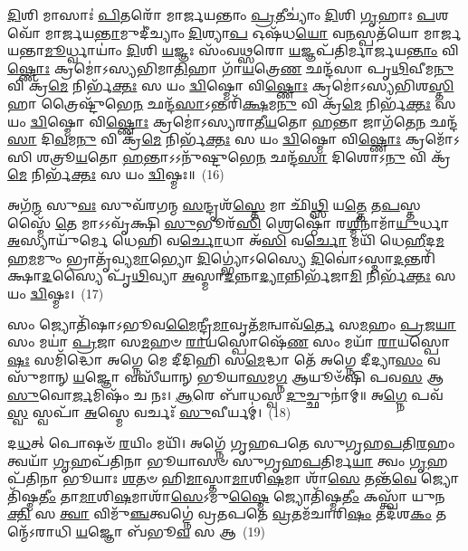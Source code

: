 \-\ul{𑌦𑌿}\-𑌶𑌿 𑌮𑌾𑌸𑌾𑌃॑ \ul{𑌪𑌿}\-𑌤𑌰𑍋᳴ 𑌮𑌾𑌰𑍍𑌜𑌯𑌨𑍍𑌤𑌾𑌂 \ul{𑌪𑍍𑌰}\-𑌤𑍀𑌚𑍍𑌯𑌾𑌂॑ \ul{𑌦𑌿}\-𑌶𑌿 \ul{𑌗𑍃}\-𑌹𑌾𑌃 \ul{𑌪}\-𑌶𑌵𑍋᳴ 𑌮𑌾𑌰𑍍𑌜𑌯\-\ul{𑌨𑍍𑌤𑌾}\-𑌮𑍁𑌦𑍀॑𑌚𑍍𑌯𑌾𑌂 \ul{𑌦𑌿}\-𑌶𑍍𑌯𑌾\-\ul{𑌪} 𑌓𑌷᳴𑌧\-\ul{𑌯𑍋} 𑌵\-\ul{𑌨}\-𑌸𑍍𑌪𑌤᳴𑌯𑍋 𑌮𑌾𑌰𑍍𑌜𑌯𑌨𑍍𑌤𑌾\-\ul{𑌮𑍂}\-𑌰𑍍𑌧𑍍𑌵𑌾𑌯𑌾𑌂॑ \ul{𑌦𑌿}\-𑌶𑌿 \ul{𑌯}\-𑌜𑍍𑌞𑌃 𑌸𑌂᳴𑌵\-\ul{𑌥𑍍𑌸}\-𑌰𑍋 \ul{𑌯}\-𑌜𑍍𑌞𑌪᳴𑌤𑌿𑌰𑍍𑌮𑌾𑌰𑍍𑌜𑌯\-\ul{𑌨𑍍𑌤𑌾𑌂} 𑌵𑌿\-\ul{𑌷𑍍𑌣𑍋𑌃} 𑌕𑍍𑌰𑌮𑍋॑\-𑌽𑌸𑍍𑌯𑌭𑌿𑌮𑌾\-\ul{𑌤𑌿}\-𑌹𑌾 𑌗𑌾᳴\-\ul{𑌯}\-𑌤𑍍𑌰𑍇\-\ul{𑌣} 𑌛𑌨𑍍𑌦᳴𑌸𑌾 𑌪𑍃\-\ul{𑌥𑌿}\-𑌵𑍀𑌮\-\ul{𑌨𑍁} 𑌵𑌿 𑌕𑍍𑌰᳴\-\ul{𑌮𑍇} 𑌨𑌿𑌰𑍍𑌭᳴\-\ul{𑌕𑍍𑌤𑌃} 𑌸 𑌯𑌂 \ul{𑌦𑍍𑌵𑌿}\-𑌷𑍍𑌮𑍋 𑌵𑌿\-\ul{𑌷𑍍𑌣𑍋𑌃} 𑌕𑍍𑌰𑌮𑍋॑\-𑌽𑌸𑍍𑌯𑌭𑌿𑌶\-\ul{𑌸𑍍𑌤𑌿}\-𑌹𑌾 𑌤𑍍𑌰𑍈𑌷𑍍𑌟𑍁᳴𑌭𑍇\-\ul{𑌨} 𑌛𑌨𑍍𑌦᳴\-\ul{𑌸𑌾}\-\-𑌽𑌨𑍍𑌤𑌰𑌿᳴\-\ul{𑌕𑍍𑌷}\-𑌮\-\ul{𑌨𑍁} 𑌵𑌿 𑌕𑍍𑌰᳴\-\ul{𑌮𑍇} 𑌨𑌿𑌰𑍍𑌭᳴\-\ul{𑌕𑍍𑌤𑌃} 𑌸 𑌯𑌂 \ul{𑌦𑍍𑌵𑌿}\-𑌷𑍍𑌮𑍋 𑌵𑌿\-\ul{𑌷𑍍𑌣𑍋𑌃} 𑌕𑍍𑌰𑌮𑍋॑\-𑌽𑌸𑍍𑌯𑌰𑌾𑌤𑍀\-\ul{𑌯}\-𑌤𑍋 \ul{𑌹}\-𑌨𑍍𑌤𑌾 𑌜𑌾𑌗᳴𑌤𑍇\-\ul{𑌨} 𑌛𑌨𑍍𑌦᳴\-\ul{𑌸𑌾} 𑌦𑌿\-\ul{𑌵}\-𑌮\-\ul{𑌨𑍁} 𑌵𑌿 𑌕𑍍𑌰᳴\-\ul{𑌮𑍇} 𑌨𑌿𑌰𑍍𑌭᳴\-\ul{𑌕𑍍𑌤𑌃} 𑌸 𑌯𑌂 \ul{𑌦𑍍𑌵𑌿}\-𑌷𑍍𑌮𑍋 𑌵𑌿\-\ul{𑌷𑍍𑌣𑍋𑌃} 𑌕𑍍𑌰𑌮𑍋᳴\-𑌽𑌸𑌿 𑌶𑌤𑍍𑌰𑍂\-\ul{𑌯}\-𑌤𑍋 \ul{𑌹}\-𑌨𑍍𑌤𑌾\-𑌽\-𑌽𑌨𑍁᳴𑌷𑍍𑌟𑍁𑌭𑍇\-\ul{𑌨} 𑌛𑌨𑍍𑌦᳴\-\ul{𑌸𑌾} 𑌦𑌿𑌶𑍋\-𑌽\-\ul{𑌨𑍁} 𑌵𑌿 𑌕𑍍𑌰᳴\-\ul{𑌮𑍇} 𑌨𑌿𑌰𑍍𑌭᳴\-\ul{𑌕𑍍𑌤𑌃} 𑌸 𑌯𑌂 \ul{𑌦𑍍𑌵𑌿}\-𑌷𑍍𑌮𑌃॥~(16)

{\anuvakamend[{𑌦𑌕𑍍𑌷𑌿᳴𑌣𑌾𑌯𑌾𑌂 \ul{𑌦𑍍𑌵𑌿}\-𑌷𑍍𑌮𑍋 𑌵𑌿\-\ul{𑌷𑍍𑌣𑍋}\-𑌰𑍇\-\ul{𑌕𑌾}\-𑌨𑍍𑌨\-\ul{𑌤𑍍𑌰𑌿}\-\-\ul{𑍞}\-𑌶𑌚𑍍𑌚᳴}]}%

𑌅𑌗᳴\-\ul{𑌨𑍍𑌮} 𑌸𑍁\-\ul{𑌵𑌃} 𑌸𑍁𑌵᳴𑌰𑌗𑌨𑍍𑌮 \ul{𑌸}\-𑌨𑍍𑌦𑍃𑌶᳴\-\ul{𑌸𑍍𑌤𑍇} 𑌮𑌾 𑌛𑌿᳴\-\ul{𑌥𑍍𑌸𑌿} 𑌯\-\ul{𑌤𑍍𑌤𑍇} 𑌤\-\ul{𑌪}\-𑌸𑍍𑌤𑌸𑍍𑌮𑍈᳴ \ul{𑌤𑍇} 𑌮𑌾\-𑌽\-𑌽𑌵𑍃᳴𑌕𑍍𑌷𑌿 \ul{𑌸𑍁}\-𑌭𑍂𑌰᳴\-\ul{𑌸𑌿} 𑌶𑍍𑌰𑍇𑌷𑍍𑌠𑍋᳴ 𑌰\-\ul{𑌶𑍍𑌮𑍀}\-𑌨𑌾𑌮𑌾᳴\-\ul{𑌯𑍁}\-𑌰𑍍𑌧𑌾 \ul{𑌅}\-𑌸𑍍𑌯𑌾𑌯𑍁᳴𑌰𑍍𑌮𑍇 𑌧𑍇𑌹𑌿 𑌵\-\ul{𑌰𑍍𑌚𑍋}\-𑌧𑌾 𑌅᳴\-\ul{𑌸𑌿} 𑌵\-\ul{𑌰𑍍𑌚𑍋} 𑌮𑌯𑌿᳴ 𑌧𑍇\-\ul{𑌹𑍀}\-𑌦\-\ul{𑌮}\-𑌹\-\ul{𑌮}\-𑌮𑍁𑌂 𑌭𑍍𑌰𑌾𑌤𑍃᳴𑌵𑍍𑌯\-\ul{𑌮𑌾}\-𑌭𑍍𑌯𑍋 \ul{𑌦𑌿}\-𑌗𑍍𑌭𑍍𑌯𑍋॑\-𑌽𑌸𑍍𑌯𑍈 \ul{𑌦𑌿}\-𑌵𑍋॑\-𑌽𑌸𑍍𑌮𑌾\-\ul{𑌦}\-𑌨𑍍𑌤𑌰𑌿᳴𑌕𑍍𑌷𑌾\-\ul{𑌦}\-𑌸𑍍𑌯𑍈 𑌪𑍃᳴\-\ul{𑌥𑌿}\-𑌵𑍍𑌯𑌾 \ul{𑌅}\-𑌸𑍍𑌮𑌾\-\ul{𑌦}\-𑌨𑍍𑌨𑌾\-\ul{𑌦𑍍𑌯𑌾}\-𑌨𑍍𑌨𑌿𑌰𑍍𑌭᳴𑌜𑌾\-\ul{𑌮𑌿} 𑌨𑌿𑌰𑍍𑌭᳴\-\ul{𑌕𑍍𑌤𑌃} 𑌸 𑌯𑌂 \ul{𑌦𑍍𑌵𑌿}\-𑌷𑍍𑌮𑌃।~(17)

𑌸𑌂 𑌜𑍍𑌯𑍋𑌤𑌿᳴𑌷𑌾\-𑌽𑌭𑍂𑌵\-\ul{𑌮𑍈}\-𑌨𑍍𑌦𑍍𑌰𑍀\-\ul{𑌮𑌾}\-𑌵𑍃𑌤᳴\-\ul{𑌮}\-𑌨𑍍𑌵𑌾𑌵᳴\-\ul{𑌰𑍍𑌤𑍇} 𑌸\-\ul{𑌮}\-𑌹𑌂 \ul{𑌪𑍍𑌰}\-𑌜\-\ul{𑌯𑌾} 𑌸𑌂 𑌮𑌯𑌾॑ \ul{𑌪𑍍𑌰}\-𑌜𑌾 𑌸\-\ul{𑌮}\-𑌹𑍞 \ul{𑌰𑌾}\-𑌯𑌸𑍍𑌪𑍋𑌷𑍇᳴\-\ul{𑌣} 𑌸𑌂 𑌮𑌯𑌾᳴ \ul{𑌰𑌾}\-𑌯𑌸𑍍𑌪𑍋\-\ul{𑌷𑌃} 𑌸𑌮𑌿᳴𑌦𑍍𑌧𑍋 𑌅𑌗𑍍𑌨𑍇 𑌮𑍇 𑌦𑍀𑌦𑌿𑌹𑌿 𑌸\-\ul{𑌮𑍇}\-𑌦𑍍𑌧𑌾 𑌤𑍇᳴ 𑌅𑌗𑍍𑌨𑍇 𑌦𑍀𑌦𑍍𑌯𑌾\-\ul{𑌸𑌂} 𑌵𑌸𑍁᳴𑌮𑌾𑌨𑍍 \ul{𑌯}\-𑌜𑍍𑌞𑍋 𑌵𑌸𑍀᳴𑌯𑌾𑌨𑍍 𑌭𑍂𑌯𑌾\-\ul{𑌸}\-𑌮\-\ul{𑌗𑍍𑌨} 𑌆𑌯𑍂𑍞᳴𑌷𑌿 𑌪𑌵\-\ul{𑌸} 𑌆 \ul{𑌸𑍁}\-𑌵𑍋\-\ul{𑌰𑍍𑌜}\-𑌮𑌿𑌷𑌂᳴ 𑌚 𑌨𑌃। \ul{𑌆}\-𑌰𑍇 𑌬𑌾᳴𑌧𑌸𑍍𑌵 \ul{𑌦𑍁}\-𑌚𑍍𑌛𑍁𑌨𑌾॑𑌮𑍍॥ 𑌅\-\ul{𑌗𑍍𑌨𑍇} 𑌪𑌵᳴\-\ul{𑌸𑍍𑌵} 𑌸𑍍𑌵𑌪𑌾᳴ \ul{𑌅}\-𑌸𑍍𑌮𑍇 𑌵𑌰𑍍𑌚𑌃᳴ \ul{𑌸𑍁}\-𑌵𑍀𑌰𑍍𑌯𑌮𑍍॑।~(18)

𑌦\-\ul{𑌧}\-𑌤𑍍 𑌪𑍋𑌷𑍞᳴ \ul{𑌰}\-𑌯𑌿𑌂 𑌮𑌯𑌿᳴। 𑌅𑌗𑍍𑌨𑍇᳴ 𑌗𑍃𑌹𑌪𑌤𑍇 𑌸𑍁𑌗𑍃𑌹\-\ul{𑌪}\-𑌤𑌿\-\ul{𑌰}\-𑌹𑌂 𑌤𑍍𑌵𑌯𑌾᳴ \ul{𑌗𑍃}\-𑌹𑌪᳴𑌤𑌿𑌨𑌾 𑌭𑍂𑌯𑌾𑌸𑍞 𑌸𑍁𑌗𑍃𑌹\-\ul{𑌪}\-𑌤𑌿𑌰𑍍𑌮\-\ul{𑌯𑌾} 𑌤𑍍𑌵𑌂 \ul{𑌗𑍃}\-𑌹𑌪᳴𑌤𑌿𑌨𑌾 𑌭𑍂𑌯𑌾𑌃 \ul{𑌶}\-𑌤𑍞 𑌹𑌿\-\ul{𑌮𑌾}\-𑌸𑍍𑌤𑌾\-\ul{𑌮𑌾}\-𑌶𑌿\-\ul{𑌷}\-𑌮𑌾 𑌶𑌾᳴\-\ul{𑌸𑍇} 𑌤𑌨𑍍𑌤᳴\-\ul{𑌵𑍇} 𑌜𑍍𑌯𑍋𑌤𑌿᳴𑌷𑍍𑌮\-\ul{𑌤𑍀𑌂} 𑌤𑌾\-\ul{𑌮𑌾}\-𑌶𑌿\-\ul{𑌷}\-𑌮𑌾𑌶𑌾᳴\-\ul{𑌸𑍇}\-\-𑌽𑌮𑍁\-\ul{𑌷𑍍𑌮𑍈} 𑌜𑍍𑌯𑍋𑌤𑌿᳴𑌷𑍍𑌮\-\ul{𑌤𑍀𑌂} 𑌕𑌸𑍍𑌤𑍍𑌵𑌾᳴ 𑌯𑍁𑌨\-\ul{𑌕𑍍𑌤𑌿} 𑌸 \ul{𑌤𑍍𑌵𑌾} 𑌵𑌿𑌮𑍁᳴\-\ul{𑌞𑍍𑌚}\-𑌤𑍍𑌵𑌗𑍍𑌨𑍇॑ 𑌵𑍍𑌰𑌤𑌪𑌤𑍇 \ul{𑌵𑍍𑌰}\-𑌤𑌮᳴𑌚𑌾𑌰𑌿\-\ul{𑌷𑌂} 𑌤𑌦᳴𑌶\-\ul{𑌕𑌂} 𑌤𑌨𑍍𑌮𑍇᳴\-𑌽𑌰𑌾𑌧𑌿 \ul{𑌯}\-𑌜𑍍𑌞𑍋 𑌬᳴𑌭𑍂\-\ul{𑌵} 𑌸 𑌆~(19)

